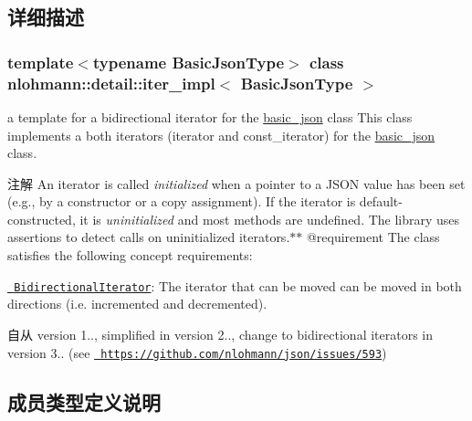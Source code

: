 \subsection{详细描述}
\subsubsection*{template$<$typename Basic\+Json\+Type$>$\newline
class nlohmann\+::detail\+::iter\+\_\+impl$<$ Basic\+Json\+Type $>$}

a template for a bidirectional iterator for the \mbox{\hyperlink{classnlohmann_1_1basic__json}{basic\+\_\+json}} class This class implements a both iterators (iterator and const\+\_\+iterator) for the \mbox{\hyperlink{classnlohmann_1_1basic__json}{basic\+\_\+json}} class. 

\begin{DoxyNote}{注解}
An iterator is called {\itshape initialized} when a pointer to a J\+S\+ON value has been set (e.\+g., by a constructor or a copy assignment). If the iterator is default-\/constructed, it is {\itshape uninitialized} and most methods are undefined. The library uses assertions to detect calls on uninitialized iterators.$\ast$$\ast$ @requirement The class satisfies the following concept requirements\+:
\begin{DoxyItemize}
\item \href{https://en.cppreference.com/w/cpp/named_req/BidirectionalIterator}{\texttt{ Bidirectional\+Iterator}}\+: The iterator that can be moved can be moved in both directions (i.\+e. incremented and decremented). 
\end{DoxyItemize}
\end{DoxyNote}
\begin{DoxySince}{自从}
version 1.., simplified in version 2.., change to bidirectional iterators in version 3.. (see \href{https://github.com/nlohmann/json/issues/593}{\texttt{ https\+://github.\+com/nlohmann/json/issues/593}}) 
\end{DoxySince}


\subsection{成员类型定义说明}
\mbox{\label{classnlohmann_1_1detail_1_1iter__impl_ad9e091f5c70b34b5b1abc1ab15fd9106}} 
